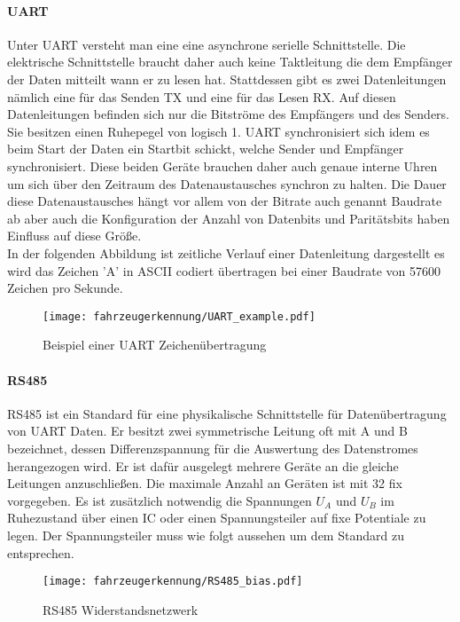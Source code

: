 \paragraph{UART}\mbox{}


Unter UART versteht man eine eine asynchrone serielle Schnittstelle. Die elektrische Schnittstelle braucht daher auch keine Taktleitung die dem Empfänger der Daten mitteilt wann er zu lesen hat. Stattdessen gibt es zwei Datenleitungen nämlich eine 
für das Senden TX und eine für das Lesen RX. Auf diesen Datenleitungen befinden sich nur die Bitströme des Empfängers und des Senders. Sie besitzen einen Ruhepegel von logisch 1.
UART synchronisiert sich idem es beim Start der Daten ein Startbit schickt, welche Sender und Empfänger synchronisiert. 
Diese beiden Geräte brauchen daher auch genaue interne Uhren um sich über den Zeitraum des Datenaustausches synchron zu halten.
Die Dauer diese Datenaustausches hängt vor allem von der Bitrate auch genannt Baudrate ab aber auch die Konfiguration der Anzahl von Datenbits und Paritätsbits haben Einfluss auf diese Größe. 
\\
In der folgenden Abbildung ist zeitliche Verlauf einer Datenleitung dargestellt es wird das Zeichen 'A' in ASCII codiert übertragen bei einer Baudrate von 57600 Zeichen pro Sekunde.

\begin{figure}[H]
    \centering
    \texttt{[image: fahrzeugerkennung/UART\_example.pdf]}
    \caption{Beispiel einer UART Zeichenübertragung}
\end{figure}

\paragraph{RS485}\label{sec:RS485}\mbox{}

RS485 ist ein Standard für eine physikalische Schnittstelle für Datenübertragung von UART Daten. Er besitzt zwei symmetrische Leitung oft mit A und B bezeichnet, dessen Differenzspannung für die Auswertung
des Datenstromes herangezogen wird. Er ist dafür ausgelegt mehrere Geräte an die gleiche Leitungen anzuschließen. Die maximale Anzahl an Geräten ist mit 32 fix vorgegeben. Es ist zusätzlich notwendig die Spannungen 
$U_{A}$ und $U_{B}$ im Ruhezustand über einen IC oder einen Spannungsteiler auf fixe Potentiale zu legen. Der Spannungsteiler muss wie folgt aussehen um dem Standard zu entsprechen.

\begin{figure}[H]
    \centering
    \texttt{[image: fahrzeugerkennung/RS485\_bias.pdf]}
    \caption{RS485 Widerstandsnetzwerk}
    \label{fig:rs485_bias}
\end{figure}

